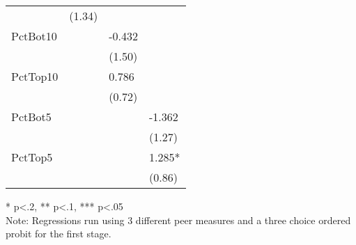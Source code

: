 \begin{table}[htb]
\begin{threeparttable}
\begin{tabular}{l l l l}
               & (1.34)                        &                               &                              \\
      PctBot10 &                               & -0.432                        &                              \\
               &                               & (1.50)                        &                              \\
      PctTop10 &                               & 0.786                         &                              \\
               &                               & (0.72)                        &                              \\
      PctBot5  &                               &                               & -1.362                       \\
               &                               &                               & (1.27)                       \\
      PctTop5  &                               &                               & 1.285*                       \\
               &                               &                               & (0.86)                       \\
      \hline
      \hline
    \end{tabular}
    \begin{tablenotes}
    \item{* p<.2, ** p<.1, *** p<.05 \\Note: Regressions run using 3 different peer measures and a three choice ordered probit for the first stage.}
    \end{tablenotes}
    \centering
  \end{threeparttable}
\end{table}

\clearpage{}

